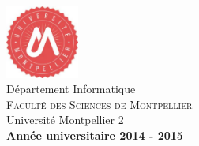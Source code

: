 \begin{titlepage}
\begin{center}
\vfill

\includegraphics[width=0.18\textwidth]{logo}\\[0.1in]
\normalsize {Département Informatique}\\
\normalsize
\textsc{Faculté des Sciences de Montpellier}\\
Université Montpellier 2 \\ [0.08in]
\vfill
\bf Année universitaire 2014 - 2015

\end{center}

\end{titlepage}